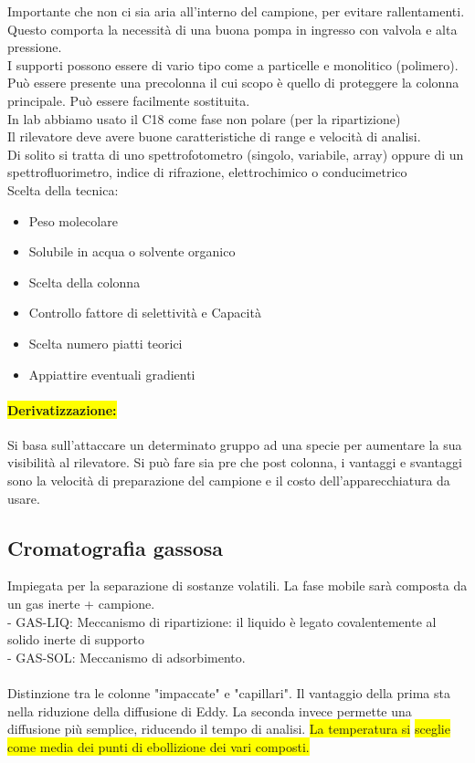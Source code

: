 \documentclass{article}
\begin{document}
Importante che non ci sia aria all'interno del campione, per evitare rallentamenti. Questo comporta la necessità di una buona pompa in ingresso con valvola e alta pressione.
\\I supporti possono essere di vario tipo come a particelle e monolitico (polimero).
\\Può essere presente una precolonna il cui scopo è quello di proteggere la colonna principale. Può essere facilmente sostituita.
\\In lab abbiamo usato il C18 come fase non polare (per la ripartizione)
\\Il rilevatore deve avere buone caratteristiche di range e velocità di analisi.
\\Di solito si tratta di uno spettrofotometro (singolo, variabile, array) oppure di un spettrofluorimetro, indice di rifrazione, elettrochimico o conducimetrico 
\\Scelta della tecnica:
\begin{itemize}
	\item Peso molecolare
	\item Solubile in acqua o solvente organico
	\item Scelta della colonna
	\item Controllo fattore di selettività e Capacità
	\item Scelta numero piatti teorici
	\item Appiattire eventuali gradienti
\end{itemize}
\paragraph{\colorbox{yellow}{Derivatizzazione:} } Si basa sull'attaccare un determinato gruppo ad una specie per aumentare la sua visibilità al rilevatore.
Si può fare sia pre che post colonna, i vantaggi e svantaggi sono la velocità di preparazione del campione e il costo dell'apparecchiatura da usare.

\subsection{Cromatografia gassosa}

Impiegata per la separazione di sostanze volatili. La fase mobile sarà composta da un gas inerte + campione.
\\- GAS-LIQ: Meccanismo di ripartizione: il liquido è legato covalentemente al solido inerte di supporto
\\- GAS-SOL: Meccanismo di adsorbimento.
\\\\
Distinzione tra le colonne "impaccate" e "capillari". Il vantaggio della prima sta nella riduzione della diffusione di Eddy. La seconda invece permette una diffusione più semplice, riducendo il tempo di analisi. \colorbox{yellow}{La temperatura si} \colorbox{yellow}{sceglie come media dei punti di ebollizione dei vari composti.}
\end{document}
